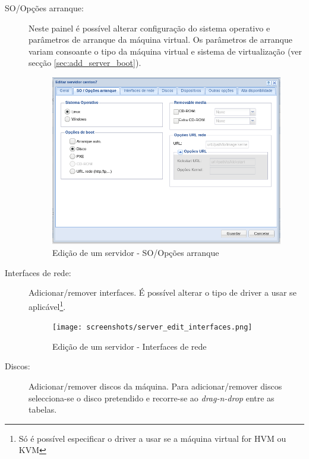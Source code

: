 \begin{description}
	\item[SO/Opções arranque:] Neste painel é possível alterar configuração do sistema operativo e parâmetros de arranque da máquina virtual.
        Os parâmetros de arranque variam consoante o tipo da máquina virtual e sistema de virtualização (ver secção \ref{sec:add_server_boot}).
		\begin{figure}[H]
        		\begin{center}
		        \includegraphics[scale=0.5]{screenshots/server_edit_options.png}
        		\caption{Edição de um servidor - SO/Opções arranque}
	        	\label{fig:server_edit_options}
	        	\end{center}
		\end{figure}

	\item[Interfaces de rede:] Adicionar/remover interfaces. É possível alterar o tipo de driver a usar se aplicável\footnote{Só é possível especificar o driver a usar se a máquina virtual for HVM ou KVM}.
		\begin{figure}[H]
        		\begin{center}
		        \texttt{[image: screenshots/server\_edit\_interfaces.png]}
        		\caption{Edição de um servidor - Interfaces de rede}
	        	\label{fig:server_edit_interfaces}
	        	\end{center}
		\end{figure}

	\item[Discos:] Adicionar/remover discos da máquina. Para adicionar/remover discos selecciona-se o disco pretendido e recorre-se ao \emph{drag-n-drop} entre as tabelas.
                    

\end{description}
